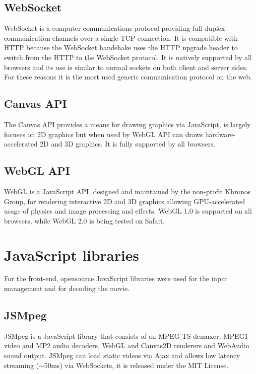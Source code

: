 \subsection{WebSocket}
WebSocket is a computer communications protocol providing full-duplex communication channels over a single TCP connection. It is compatible with HTTP because the WebSocket handshake uses the HTTP upgrade header to switch from the HTTP to the WebSocket protocol. It is natively supported by all browsers and its use is similar to normal sockets on both client and server sides. For these reasons it is the most used generic communication protocol on the web\cite{WebSocket_Web_APIs}.

\subsection{Canvas API}
The Canvas API provides a means for drawing graphics via JavaScript, is largely focuses on 2D graphics but when used by WebGL API can draws hardware-accelerated 2D and 3D graphics. It is fully supported by all browsers\cite{Canvas_API}.

\subsection{WebGL API}
WebGL is a JavaScript API, designed and maintained by the non-profit Khronos Group, for rendering interactive 2D and 3D graphics allowing GPU-accelerated usage of physics and image processing and effects. WebGL 1.0 is supported on all browsers, while WebGL 2.0 is being tested on Safari\cite{WebGL}.



\section{JavaScript libraries}
For the front-end, opensource JavaScript libraries were used for the input management and for decoding the movie.

\subsection{JSMpeg}
JSMpeg is a JavaScript library that consists of an MPEG-TS demuxer, MPEG1 video and MP2 audio decoders, WebGL and Canvas2D renderers and WebAudio sound output. JSMpeg can load static videos via Ajax and allows low latency streaming ($\sim$50ms) via WebSockets, it is released under the MIT License\cite{JSMpeg}.

